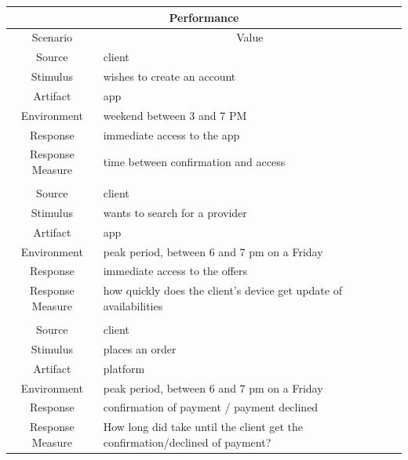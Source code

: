\begin{table}[H]
    \begin{tabularx}{\textwidth}{|c|X|}
        \hline
        \multicolumn{2}{c}{\textbf{Performance}} \\
        \hline
        \toprule
        \multicolumn{1}{c}{Scenario} & \multicolumn{1}{c}{Value} \\
        \midrule
        Source & \gls{client}  \\
        Stimulus & wishes to create an account \\
        Artifact & app \\
        Environment & weekend between 3 and 7 PM \\
        Response & immediate access to the app \\
        Response Measure & time between confirmation and access \\
         & \\
        Source & \gls{client}  \\
        Stimulus & wants to search for a \gls{provider} \\
        Artifact & app \\
        Environment & peak period, between 6 and 7 pm on a Friday \\
        Response & immediate access to the offers \\
        Response Measure & how quickly does the client's device get update of availabilities \\
        & \\
        Source & \gls{client}  \\
        Stimulus & places an order \\
        Artifact & platform \\
        Environment & peak period, between 6 and 7 pm on a Friday \\
        Response & confirmation of payment / payment declined \\
        Response Measure & How long did take until the client get the confirmation/declined of payment?\\
        \bottomrule
    \end{tabularx}
\end{table}

